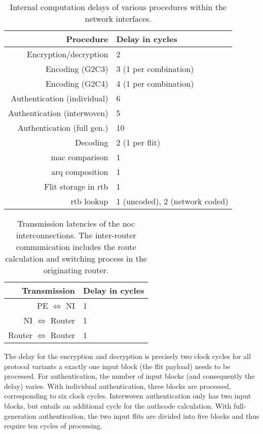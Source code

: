 \begin{table}
    \centering
    \begin{tabulary}{\textwidth}{R|L}
        Procedure & Delay in cycles \\\hline
        Encryption/decryption & 2 \\
        Encoding (G2C3) & 3 (1 per combination) \\
        Encoding (G2C4) & 4 (1 per combination) \\
        Authentication (individual) & 6 \\
        Authentication (interwoven) & 5 \\
        Authentication (full gen.) & 10 \\
        Decoding & 2 (1 per flit) \\
        \gls{mac} comparison & 1 \\
        \gls{arq} composition & 1 \\
        Flit storage in \gls{rtb} & 1 \\
        \Gls{rtb} lookup & 1 (uncoded), 2 (network coded)
    \end{tabulary}
    \caption[Internal computation delay in the network interface]{Internal computation delays of various procedures within the network interfaces.}
    \label{tab:processinglatencies}
\end{table}

\begin{table}
    \centering
    \begin{tabulary}{\textwidth}{R|L}
        Transmission & Delay in cycles \\\hline
        PE $\Leftrightarrow$ NI & 1 \\
        NI $\Leftrightarrow$ Router & 1 \\
        Router $\Leftrightarrow$ Router & 1
    \end{tabulary}
    \caption[Transmission latencies for the NoC interconnections]{Transmission latencies of the \gls{noc} interconnections. The inter-router
    communication includes the route calculation and switching process in the originating router.}
    \label{tab:transmissionlatencies}
\end{table}

The delay for the encryption and decryption is precisely two clock cycles for all protocol variants a exactly one input block (the flit payload)
needs to be processed. For authentication, the number of input blocks (and consequently the delay) varies. With individual authentication, three
blocks are processed, corresponding to six clock cycles. Interwoven authentication only has two input blocks, but entails an additional cycle for the
authcode calculation. With full-generation authentication, the two input flits are divided into five blocks and thus require ten cycles of
processing.

